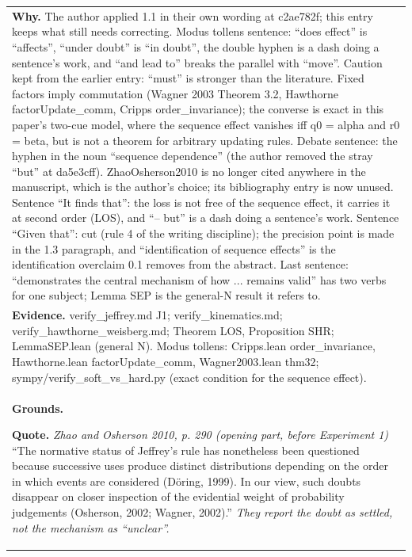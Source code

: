 \documentclass[10pt]{article}
\theoremstyle{definition}
\newlength{\fullw}\setlength{\fullw}{25.9cm}
\begin{document}
{\begin{longtable}{|p{0.9cm}|p{12.2cm}|p{12.2cm}|}
\multicolumn{3}{|p{\fullw}|}{\textbf{Why.} The author applied 1.1 in their own wording at c2ae782f; this entry keeps what still needs correcting. Modus tollens sentence: ``does effect'' is ``affects'', ``under doubt'' is ``in doubt'', the double hyphen is a dash doing a sentence's work, and ``and lead to'' breaks the parallel with ``move''. Caution kept from the earlier entry: ``must'' is stronger than the literature. Fixed factors imply commutation (Wagner 2003 Theorem 3.2, Hawthorne factorUpdate\_comm, Cripps order\_invariance); the converse is exact in this paper's two-cue model, where the sequence effect vanishes iff q0 = alpha and r0 = beta, but is not a theorem for arbitrary updating rules. Debate sentence: the hyphen in the noun ``sequence dependence'' (the author removed the stray ``but'' at da5e3cff). ZhaoOsherson2010 is no longer cited anywhere in the manuscript, which is the author's choice; its bibliography entry is now unused. Sentence ``It finds that'': the loss is not free of the sequence effect, it carries it at second order (LOS), and ``-- but'' is a dash doing a sentence's work. Sentence ``Given that'': cut (rule 4 of the writing discipline); the precision point is made in the 1.3 paragraph, and ``identification of sequence effects'' is the identification overclaim 0.1 removes from the abstract. Last sentence: ``demonstrates the central mechanism of how ... remains valid'' has two verbs for one subject; Lemma SEP is the general-N result it refers to.} \\
\multicolumn{3}{|p{\fullw}|}{\textbf{Evidence.} verify\_jeffrey.md J1; verify\_kinematics.md; verify\_hawthorne\_weisberg.md; Theorem LOS, Proposition SHR; LemmaSEP.lean (general N). Modus tollens: Cripps.lean order\_invariance, Hawthorne.lean factorUpdate\_comm, Wagner2003.lean thm32; sympy/verify\_soft\_vs\_hard.py (exact condition for the sequence effect).} \\ \hline
\multicolumn{3}{|p{\fullw}|}{\textbf{Grounds.}\par \textbf{Quote.} \textit{Zhao and Osherson 2010, p. 290 (opening part, before Experiment 1)} \newline ``The normative status of Jeffrey's rule has nonetheless been
questioned because successive uses produce distinct distributions depending on
the order in which events are considered (D\"{o}ring, 1999). In our view, such
doubts disappear on closer inspection of the evidential weight of probability
judgements (Osherson, 2002; Wagner, 2002).'' \newline \textit{They report the doubt as settled, not the mechanism as ``unclear''.}} \\

\end{longtable}}
\end{document}

